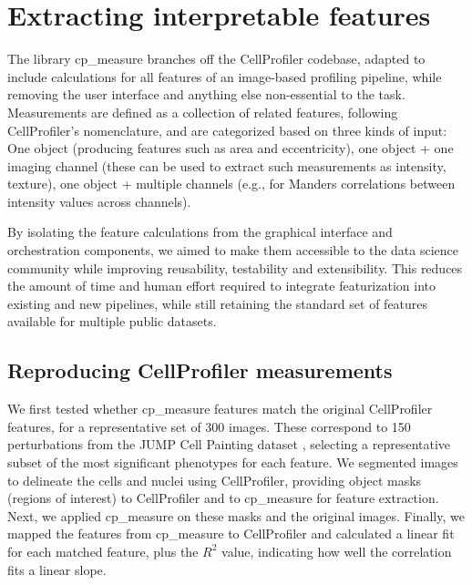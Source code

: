 \documentclass{article}
\begin{document}
\section{Extracting interpretable features}
\label{sec:org61842b5}
The library cp\_measure branches off the CellProfiler codebase, adapted to include calculations for all features of an image-based profiling pipeline, while removing the user interface and anything else non-essential to the task. Measurements are defined as a collection of related features, following CellProfiler's nomenclature, and are categorized based on three kinds of input: One object (producing features such as area and eccentricity), one object + one imaging channel (these can be used to extract such measurements as intensity, texture), one object + multiple channels (e.g., for Manders correlations between intensity values across channels).

By isolating the feature calculations from the graphical interface and orchestration components, we aimed to make them accessible to the data science community while improving reusability, testability and extensibility. This reduces the amount of time and human effort required to integrate featurization into existing and new pipelines, while still retaining the standard set of features available for multiple public datasets.

\subsection{Reproducing CellProfiler measurements}
\label{sec:org09b0cd2}
We first tested whether cp\_measure features match the original CellProfiler features, for a representative set of 300 images. These correspond to 150 perturbations from the JUMP Cell Painting dataset \citep{chandrasekaranJUMPCellPainting2023}, selecting a representative subset of the most significant phenotypes for each feature. We segmented images to delineate the cells and nuclei using CellProfiler, providing object masks (regions of interest) to CellProfiler and to cp\_measure for feature extraction. Next, we applied cp\_measure on these masks and the original images. Finally, we mapped the features from cp\_measure to CellProfiler and calculated a linear fit for each matched feature, plus the \(R^2\) value, indicating how well the correlation fits a linear slope.
\end{document}
